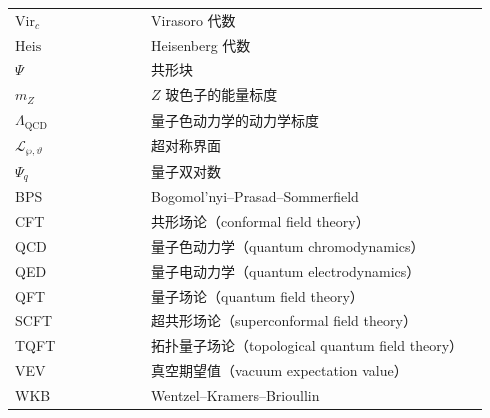 \begin{longtable}{@{}p{0.27\linewidth}p{0.67\linewidth}@{}}
$\mathrm{Vir}_c$ & Virasoro 代数 \\
$\mathrm{Heis}$ & Heisenberg 代数 \\
$\Psi$ & 共形块 \\
$m_Z$ & $Z$ 玻色子的能量标度 \\
$\Lambda_{\mathrm{QCD}}$ & 量子色动力学的动力学标度 \\
$\mathcal{L}_{\wp,\vartheta}$ & 超对称界面 \\
$\Psi_q$ & 量子双对数 \\
BPS & Bogomol'nyi–Prasad–Sommerfield \\
CFT & 共形场论（conformal field theory） \\
QCD & 量子色动力学（quantum chromodynamics） \\
QED & 量子电动力学（quantum electrodynamics） \\
QFT & 量子场论（quantum field theory） \\
SCFT & 超共形场论（superconformal field theory） \\
TQFT & 拓扑量子场论（topological quantum field theory） \\
VEV & 真空期望值（vacuum expectation value） \\
WKB & Wentzel–Kramers–Brioullin \\
\end{longtable}
\normalsize




